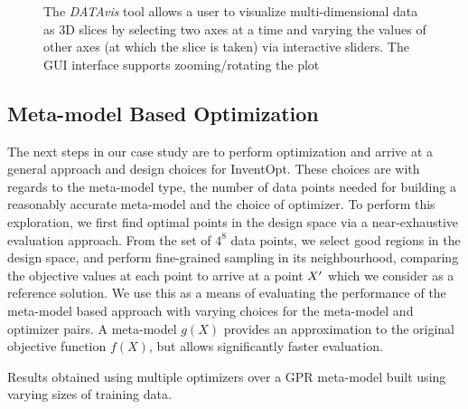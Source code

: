 
\begin{figure}[!t]  
  \hspace*{1.5cm}
  \begin{frame}{
    }
  \end{frame}
  \caption{The \textit{DATAvis} tool allows a user to visualize multi-dimensional data as 3D slices by selecting two axes at a time and varying the values of other axes (at which the slice is taken) via interactive sliders. The GUI interface supports zooming/rotating the plot}
  \label{fig:DataVis_slice}
\end{figure}




\subsection{Meta-model Based Optimization} The next steps in our case study are to perform optimization and arrive at a general approach and design choices for InventOpt. These choices are with regards to the meta-model type, the number of data points needed for building a reasonably accurate meta-model and the choice of optimizer. To perform this exploration, we first find optimal points in the design space via a near-exhaustive evaluation approach. From the set of $4^8$ data points, we select good regions in the design space, and perform fine-grained sampling in its neighbourhood, comparing the objective values at each point to arrive at a point $X\rq$ which we consider as a reference solution. We use this as a means of evaluating the performance of the meta-model based approach with varying choices for the meta-model and optimizer pairs. A meta-model $g(X)$ provides an approximation to the original objective function $f(X)$, but allows significantly faster evaluation.
%
\begin{table}[!h]\centering \fontsize{9pt}{10pt}\selectfont %
\caption{Results obtained using multiple optimizers over a GPR meta-model built using varying sizes of training data.}\label{tab:obtained_results}

\end{table}

